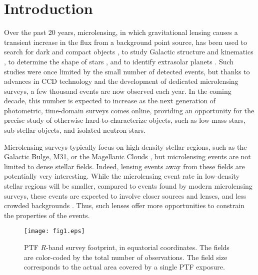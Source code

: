 \documentclass{emulateapj}
\begin{document}

\section{Introduction}
Over the past 20 years, microlensing, in which gravitational lensing causes a transient increase in the flux from a background point source, has been used to search for dark and compact objects \citep{original_macho, oslowski2008, sartore2010}, to study Galactic structure and kinematics \citep{binney2000}, to determine the shape of stars \citep{rattenbury2005}, and to identify extrasolar planets \citep[][and references therein]{gaudi2011}. Such studies were once limited by the small number of detected events, but thanks to advances in CCD technology and the development of dedicated microlensing surveys, a few thousand events are now observed each year. In the coming decade, this number is expected to increase as the next generation of photometric, time-domain surveys comes online, providing an opportunity for the precise study of otherwise hard-to-characterize objects, such as low-mass stars, sub-stellar objects, and isolated neutron stars. 

Microlensing surveys typically focus on high-density stellar regions, such as the Galactic Bulge, M31, or the Magellanic Clouds \citep[e.g.,][]{original_ogle, original_macho, eros_original, crotts1996}, but microlensing events are not limited to dense stellar fields. Indeed, lensing events away from these fields are potentially very interesting. While the microlensing event rate in low-density stellar regions will be smaller, compared to events found by modern microlensing surveys, these events are expected to involve closer sources and lenses, and less crowded backgrounds \citep{mesolensing}. Thus, such lenses offer more opportunities to constrain the properties of the events.

\begin{figure*}[!t]
\centering\texttt{[image: fig1.eps]}
\caption{PTF $R$-band survey footprint, in equatorial coordinates. The fields are color-coded by the total number of observations. The field size corresponds to the actual area covered by a single PTF exposure.}\label{fig:survey_footprint}
\end{figure*}	
\end{document}
